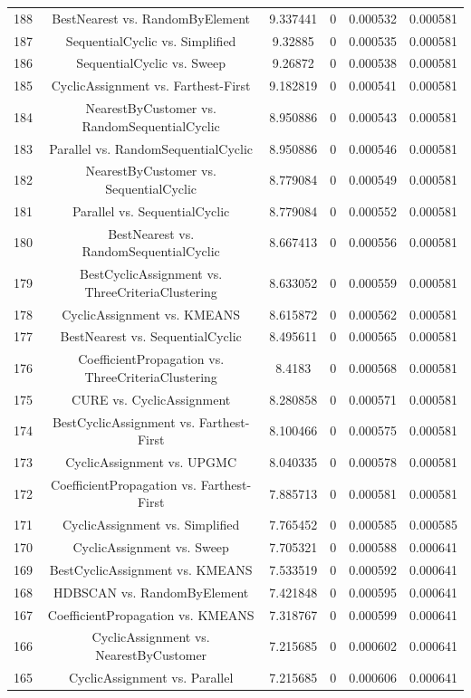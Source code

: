 \documentclass[a4paper,10pt]{article}
\begin{document}
\begin{landscape}
\begin{table}[!htp]
\begin{tabular}{cccccc}
188&BestNearest vs. RandomByElement&9.337441&0&0.000532&0.000581\\
187&SequentialCyclic vs. Simplified&9.32885&0&0.000535&0.000581\\
186&SequentialCyclic vs. Sweep&9.26872&0&0.000538&0.000581\\
185&CyclicAssignment vs. Farthest-First&9.182819&0&0.000541&0.000581\\
184&NearestByCustomer vs. RandomSequentialCyclic&8.950886&0&0.000543&0.000581\\
183&Parallel vs. RandomSequentialCyclic&8.950886&0&0.000546&0.000581\\
182&NearestByCustomer vs. SequentialCyclic&8.779084&0&0.000549&0.000581\\
181&Parallel vs. SequentialCyclic&8.779084&0&0.000552&0.000581\\
180&BestNearest vs. RandomSequentialCyclic&8.667413&0&0.000556&0.000581\\
179&BestCyclicAssignment vs. ThreeCriteriaClustering&8.633052&0&0.000559&0.000581\\
178&CyclicAssignment vs. KMEANS&8.615872&0&0.000562&0.000581\\
177&BestNearest vs. SequentialCyclic&8.495611&0&0.000565&0.000581\\
176&CoefficientPropagation vs. ThreeCriteriaClustering&8.4183&0&0.000568&0.000581\\
175&CURE vs. CyclicAssignment&8.280858&0&0.000571&0.000581\\
174&BestCyclicAssignment vs. Farthest-First&8.100466&0&0.000575&0.000581\\
173&CyclicAssignment vs. UPGMC&8.040335&0&0.000578&0.000581\\
172&CoefficientPropagation vs. Farthest-First&7.885713&0&0.000581&0.000581\\
171&CyclicAssignment vs. Simplified&7.765452&0&0.000585&0.000585\\
170&CyclicAssignment vs. Sweep&7.705321&0&0.000588&0.000641\\
169&BestCyclicAssignment vs. KMEANS&7.533519&0&0.000592&0.000641\\
168&HDBSCAN vs. RandomByElement&7.421848&0&0.000595&0.000641\\
167&CoefficientPropagation vs. KMEANS&7.318767&0&0.000599&0.000641\\
166&CyclicAssignment vs. NearestByCustomer&7.215685&0&0.000602&0.000641\\
165&CyclicAssignment vs. Parallel&7.215685&0&0.000606&0.000641\\

\end{tabular}
\end{table}
\end{landscape}
\end{document}
